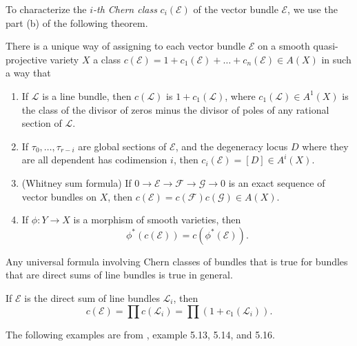 To characterize the \emph{$i$-th Chern class} $c_i(\mathcal{E})$ of the vector bundle $\mathcal{E}$, we use the part (b) of the following theorem.


\begin{theorem}
    There is a unique way of assigning to each vector bundle $\mathcal{E}$ on a smooth quasi-projective variety $X$ a class $c(\mathcal{E}) = 1 + c_1(\mathcal{E}) + \ldots + c_n(\mathcal{E}) \in A(X)$ in such a way that
    \begin{enumerate}[label=(\alph*)]
        \item If $\mathcal{L}$ is a line bundle, then $c(\mathcal{L})$ is $1 + c_1(\mathcal{L})$, where $c_1(\mathcal{L}) \in A^1(X)$ is the class of the divisor of zeros minus the divisor of poles of any rational section of $\mathcal{L}$.
        \item If $\tau_0, \dots, \tau_{r-i}$ are global sections of $\mathcal{E}$, and the degeneracy locus $D$ where they are all dependent has codimension $i$, then $c_i(\mathcal{E}) = [D] \in A^i(X)$.
        \item (Whitney sum formula) If $0 \to \mathcal{E} \to \mathcal{F} \to \mathcal{G} \to 0$ is an exact sequence of vector bundles on $X$, then $c(\mathcal{E}) = c(\mathcal{F}) c(\mathcal{G}) \in A(X)$.
        \item If $\phi \colon Y \to X$ is a morphism of smooth varieties, then 
        \[\phi^*(c(\mathcal{E})) = c(\phi^*(\mathcal{E})).\]
    \end{enumerate}
\end{theorem}

\begin{theorem}
    Any universal formula involving Chern classes of bundles that is true for bundles that are direct sums of line bundles is true in general.
\end{theorem}

\begin{corollary}\label{cor:sums}
    If $\mathcal{E}$ is the direct sum of line bundles $\mathcal{L}_i$, then 
    \[c(\mathcal{E}) = \prod c(\mathcal{L}_i) = \prod (1 + c_1(\mathcal{L}_i)).\]
\end{corollary}


The following examples are from \cite{EH16}, example 5.13, 5.14, and 5.16.


